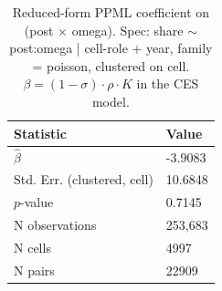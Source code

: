 \begin{table}[ht]
\centering
\caption{Reduced-form PPML coefficient on (post $\times$ omega).  Spec: share $\sim$ post:omega | cell-role + year, family = poisson, clustered on cell. $\beta = (1 - \sigma) \cdot \rho \cdot K$ in the CES model.} 
\label{tab:phase4_within_intensive_ces_ppml_beta}
\begin{tabular}{ll}
  \toprule
Statistic & Value \\ 
  \midrule
$\widehat{\beta}$ & -3.9083 \\ 
  Std. Err. (clustered, cell) & 10.6848 \\ 
  $p$-value & 0.7145 \\ 
  N observations & 253,683 \\ 
  N cells & 4997 \\ 
  N pairs & 22909 \\ 
   \bottomrule
\end{tabular}
\end{table}
